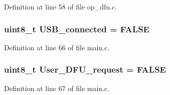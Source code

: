 \-Definition at line 58 of file op\-\_\-dfu.\-c.

\hypertarget{group___pip_xtreme_b_l_gac2fd478a40cb67cd7b769eb34ed0a063}{
\subsubsection[{\-U\-S\-B\-\_\-connected}]{\setlength{\rightskip}{0pt plus 5cm}uint8\-\_\-t {\bf \-U\-S\-B\-\_\-connected} = \-F\-A\-L\-S\-E}}\label{group___pip_xtreme_b_l_gac2fd478a40cb67cd7b769eb34ed0a063}


\-Definition at line 66 of file main.\-c.

\hypertarget{group___pip_xtreme_b_l_ga4e35257eb1d649bd7353cb4a4d37d5fb}{
\subsubsection[{\-User\-\_\-\-D\-F\-U\-\_\-request}]{\setlength{\rightskip}{0pt plus 5cm}uint8\-\_\-t {\bf \-User\-\_\-\-D\-F\-U\-\_\-request} = \-F\-A\-L\-S\-E}}\label{group___pip_xtreme_b_l_ga4e35257eb1d649bd7353cb4a4d37d5fb}


\-Definition at line 67 of file main.\-c.

